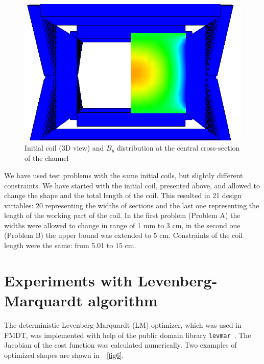 \documentclass[twocolumn,a4paper]{article}
\def\rref#1{\figurename~\ref{#1}}
\begin{document}
\begin{figure}[htb]
\begin{center}
 \includegraphics[width=0.9\linewidth]{img/initial_field-kadr.png}
 \caption{Initial coil (3D view) and $B_y$ distribution at the central cross-section of the channel}
 \label{fig5}
 \end{center}
\end{figure}

We have used test problems with the same initial coils, but slightly different constraints. We have started with the initial coil, presented above, and allowed
to change the shape and the total length of the coil. This resulted in 21 design variables: 20 representing the widths of sections and the last one representing the length of the working part of the coil.
In the first problem (Problem A) the widths were allowed to change in range of 1 mm to 3 cm, in the second one (Problem B) the upper bound was extended to 5 cm. Constraints of the coil length were the same: from 5.01 to 15 cm.

\section{Experiments with Levenberg-Marquardt algorithm}

The deterministic Levenberg-Marquardt (LM) optimizer, which was used in FMDT, was implemented with help of the public domain library \texttt{levmar}~\cite{lourakis04LM}.
The Jacobian of the cost function was calculated numerically. Two examples of optimized shapes are shown in~\rref{fig6}.
\end{document}
